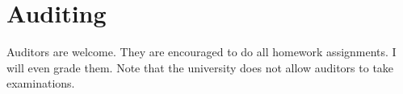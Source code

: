
\section*{Auditing}

Auditors are welcome. They are encouraged to do all homework assignments. I will even grade them. Note that the university does not allow auditors to take examinations.
